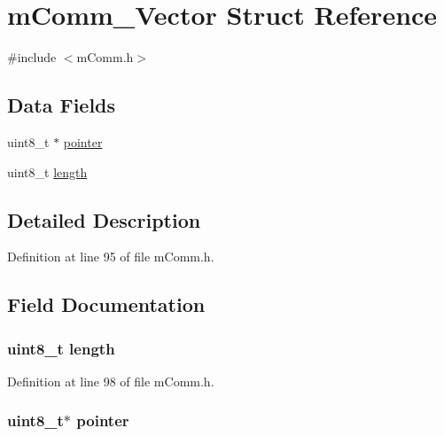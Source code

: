 \hypertarget{structm_comm___vector}{}\section{m\+Comm\+\_\+\+Vector Struct Reference}
\label{structm_comm___vector}


{\ttfamily \#include $<$m\+Comm.\+h$>$}

\subsection*{Data Fields}
\begin{DoxyCompactItemize}
\item 
uint8\+\_\+t $\ast$ \hyperlink{structm_comm___vector_a5b0f2810937b91d024abb38c4c5791b2}{pointer}
\item 
uint8\+\_\+t \hyperlink{structm_comm___vector_ab2b3adeb2a67e656ff030b56727fd0ac}{length}
\end{DoxyCompactItemize}


\subsection{Detailed Description}


Definition at line 95 of file m\+Comm.\+h.



\subsection{Field Documentation}
\hypertarget{structm_comm___vector_ab2b3adeb2a67e656ff030b56727fd0ac}{}
\subsubsection[{length}]{\setlength{\rightskip}{0pt plus 5cm}uint8\+\_\+t length}\label{structm_comm___vector_ab2b3adeb2a67e656ff030b56727fd0ac}


Definition at line 98 of file m\+Comm.\+h.

\hypertarget{structm_comm___vector_a5b0f2810937b91d024abb38c4c5791b2}{}
\subsubsection[{pointer}]{\setlength{\rightskip}{0pt plus 5cm}uint8\+\_\+t$\ast$ pointer}\label{structm_comm___vector_a5b0f2810937b91d024abb38c4c5791b2}


